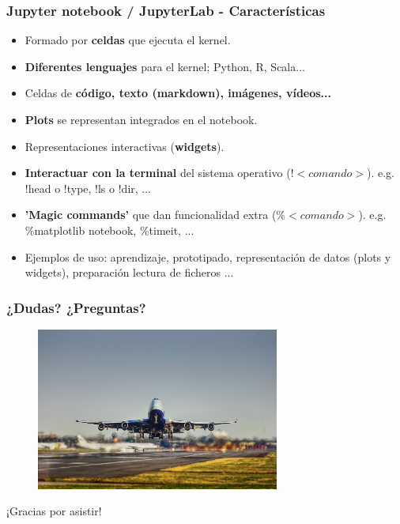 \documentclass[18pt]{beamer}
\begin{document}
\begin{frame}
	
	\frametitle{Jupyter notebook / JupyterLab - Características}

	\begin{itemize}
		\setlength\itemsep{0.3em}
		\item Formado por \textbf{celdas} que ejecuta el kernel.
		\item \textbf{Diferentes lenguajes} para el kernel;
		 Python, R, Scala...
		\item Celdas de \textbf{código, texto (markdown), 
		imágenes, vídeos...}
		\item \textbf{Plots} se representan integrados en el notebook.
		\item Representaciones interactivas (\textbf{widgets}).
		\item \textbf{Interactuar con la terminal} del sistema operativo 
		($!<comando>$). e.g. !head  o !type, !ls o !dir, ...
		\item \textbf{'Magic commands'} que dan	funcionalidad 
		extra ($\%<comando>$). e.g. \%matplotlib notebook, \%timeit, ...
		\item Ejemplos de uso: aprendizaje, prototipado, representación 
		 de datos (plots y widgets), preparación lectura de ficheros ...
	\end{itemize}
	
\end{frame}



\begin{frame}

	\frametitle{¿Dudas? ¿Preguntas?}
	
	\begin{figure}
		\includegraphics[width=8cm]{images/aircraft.jpg}
	\end{figure}

	\begin{center}
		\Large ¡Gracias por asistir!
	\end{center}
	
\end{frame}

	
\end{document}
